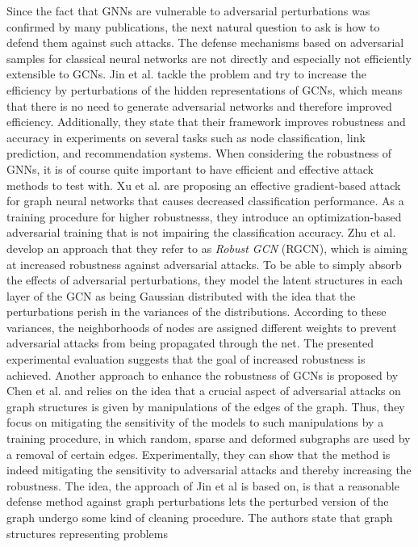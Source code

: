 \documentclass[a4paper,preprint]{sig-alternate}
\begin{document}
Since the fact that GNNs are vulnerable to adversarial perturbations was confirmed by many publications, the next natural question to ask
is how to defend them against such attacks.
The defense mechanisms based on adversarial samples for classical neural networks are not directly and especially not efficiently
extensible to GCNs. \cite{Jin_2020} Jin et al. tackle the problem and try to increase the efficiency by perturbations of the hidden representations
of GCNs, which means that there is no need to generate adversarial networks and therefore improved efficiency. Additionally, they state that
their framework improves robustness and accuracy in experiments on several tasks such as node classification, link prediction, and recommendation
systems.
When considering the robustness of GNNs, it is of course quite important to have efficient and effective attack methods to test with.
Xu et al. \cite{xu2019topology} are proposing an effective gradient-based attack for graph neural networks that causes decreased classification
performance. As a training procedure for higher robustnesss, they introduce an optimization-based adversarial training that is not
impairing the classification accuracy.
Zhu et al. \cite{10.1145/3292500.3330851} develop an approach that they refer to as \textit{Robust GCN} (RGCN), which is aiming at
increased robustness against adversarial attacks. To be able to simply absorb the effects of adversarial perturbations, they model
the latent structures in each layer of the GCN as being Gaussian distributed with the idea that the perturbations perish in the variances
of the distributions. According to these variances, the neighborhoods of nodes are assigned different weights to prevent adversarial attacks
from being propagated through the net. The presented experimental evaluation suggests that the goal of increased robustness is achieved.
Another approach to enhance the robustness of GCNs is proposed by Chen et al. \cite{Chen_2020} and relies on the idea that a crucial 
aspect of adversarial attacks on graph structures is given by manipulations of the edges of the graph.
Thus, they focus on mitigating the sensitivity of the models to such manipulations by a training procedure, in which
random, sparse and deformed subgraphs are used by a removal of certain edges. Experimentally, they can show that the method is indeed
mitigating the sensitivity to adversarial attacks and thereby increasing the robustness.
The idea, the approach of Jin et al \cite{Jin_2020_Graph} is based on, is that a reasonable defense method against graph perturbations lets
the perturbed version of the graph undergo some kind of cleaning procedure. The authors state that graph structures representing problems
\end{document}
